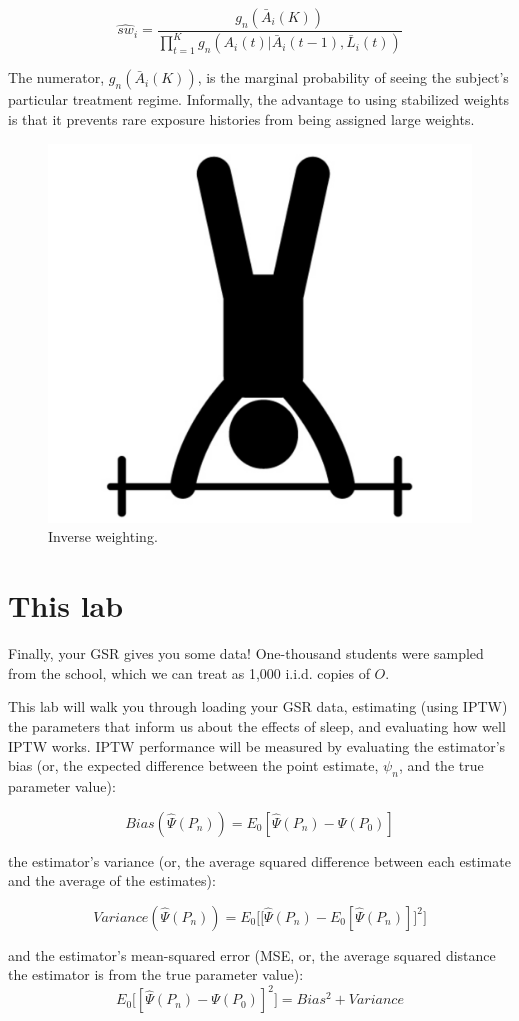 \documentclass{exam}
\begin{document}
\[
\hat{sw}_i = \frac{g_n(\bar{A}_i(K))}{\prod_{t=1}^Kg_n(A_i(t)|\bar{A}_i(t-1), \bar{L}_i(t))}
\]

\noindent The numerator, $g_n(\bar{A}_i(K))$, is the marginal probability of seeing the subject's particular treatment regime. Informally, the advantage to using stabilized weights is that it prevents rare exposure histories from being assigned large weights.


\begin{figure}
\begin{center}
\includegraphics[width=.35\textwidth]{IPTWpic.png}
\caption{Inverse weighting.}
\end{center}
\end{figure}

\section{This lab}

Finally, your GSR gives you some data! One-thousand students were sampled from the school, which we can treat as 1,000 i.i.d. copies of $O$.

\noindent This lab will walk you through loading your GSR data, estimating (using IPTW) the parameters that inform us about the effects of sleep, and evaluating how well IPTW works. IPTW performance will be measured by evaluating the estimator's bias (or, the expected difference between the point estimate, $\psi_n$, and the true parameter value):

\[
Bias(\hat{\Psi}(P_n)) = E_0[\hat{\Psi}(P_n) - \Psi(P_0)]
\]

\noindent the estimator's variance (or, the average squared difference between each estimate and the average of the estimates):

\[
Variance(\hat{\Psi}(P_n)) = E_0\Bigg[\Big[\hat{\Psi}(P_n) - E_0[\hat{\Psi}(P_n)]\Big]^2\Bigg]
\]

\noindent and the estimator's mean-squared error (MSE, or, the average squared distance the estimator is from the true parameter value):
\[
E_0\Big[[\hat{\Psi}(P_n) - \Psi(P_0)]^2\Big] = Bias^2 + Variance
\]
\end{document}
